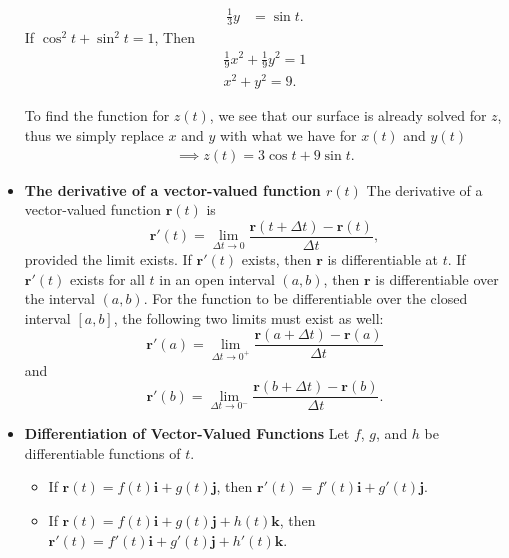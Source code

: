 \documentclass{report}
\begin{document}
\begin{itemize}
\begin{prop}
\begin{align*}
                   \frac{1}{3}y&=\sin{t}
               .\end{align*}
               If $\cos^{2}{t} + \sin^{2}{t} = 1 $, Then
               \begin{align*}
                   \frac{1}{9}x^{2} + \frac{1}{9}y^{2} = 1 \\
                   x^{2} + y^{2} = 9
               .\end{align*}
           \end{prop}
           To find the function for $z(t)$, we see that our surface is already solved for $z$, thus we simply replace $x$ and $y$ with what we have for $x(t)$ and $y(t)$
           \begin{align*}
               \implies z(t) = 3\cos{t} + 9 \sin{t}
           .\end{align*}
       \item \textbf{The derivative of a vector-valued function $r(t)$}
           The derivative of a vector-valued function $\mathbf{r}(t)$ is
           \begin{equation}
               \mathbf{r}'(t) = \lim_{\Delta t \to 0} \frac{\mathbf{r}(t + \Delta t) - \mathbf{r}(t)}{\Delta t},
           \end{equation}
           provided the limit exists. If $\mathbf{r}'(t)$ exists, then $\mathbf{r}$ is differentiable at $t$. If $\mathbf{r}'(t)$ exists for all $t$ in an open interval $(a, b)$, then $\mathbf{r}$ is differentiable over the interval $(a, b)$. For the function to be differentiable over the closed interval $[a, b]$, the following two limits must exist as well:
           \begin{equation}
               \mathbf{r}'(a) = \lim_{\Delta t \to 0^+} \frac{\mathbf{r}(a + \Delta t) - \mathbf{r}(a)}{\Delta t}
           \end{equation}
           and
           \begin{equation}
               \mathbf{r}'(b) = \lim_{\Delta t \to 0^-} \frac{\mathbf{r}(b + \Delta t) - \mathbf{r}(b)}{\Delta t}.
           \end{equation}
       \item \textbf{Differentiation of Vector-Valued Functions}
           Let $f$, $g$, and $h$ be differentiable functions of $t$.
           \begin{itemize}
               \item If $\mathbf{r}(t) = f(t)\mathbf{i} + g(t)\mathbf{j}$, then $\mathbf{r}'(t) = f'(t)\mathbf{i} + g'(t)\mathbf{j}$.
               \item If $\mathbf{r}(t) = f(t)\mathbf{i} + g(t)\mathbf{j} + h(t)\mathbf{k}$, then $\mathbf{r}'(t) = f'(t)\mathbf{i} + g'(t)\mathbf{j} + h'(t)\mathbf{k}$.

\end{itemize}
\end{itemize}
\end{document}
